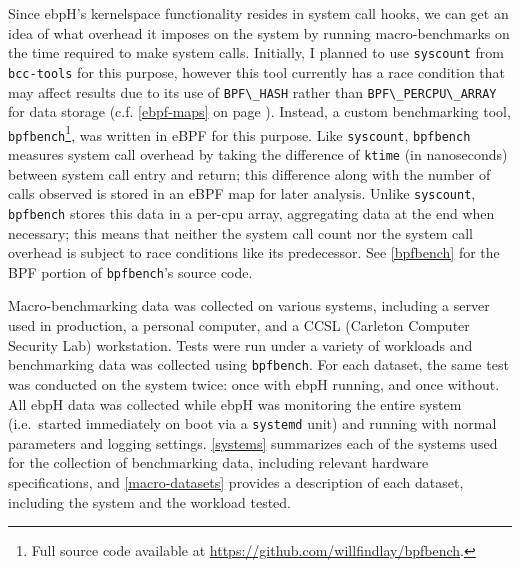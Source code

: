 \documentclass[
  12pt]{findlay}
\newcommand{\passthrough}[1]{#1}
\begin{document}
Since ebpH's kernelspace functionality resides in system call hooks, we
can get an idea of what overhead it imposes on the system by running
macro-benchmarks on the time required to make system calls. Initially, I
planned to use \passthrough{\lstinline!syscount!} \autocite{syscount}
from \passthrough{\lstinline!bcc-tools!} for this purpose, however this
tool currently has a race condition that may affect results due to its
use of \passthrough{\lstinline!BPF\_HASH!} rather than
\passthrough{\lstinline!BPF\_PERCPU\_ARRAY!} for data storage (c.f.
\autoref{ebpf-maps} on page \pageref{ebpf-maps}). Instead, a custom
benchmarking tool,
\passthrough{\lstinline!bpfbench!}\footnote{Full source code available at
\url{https://github.com/willfindlay/bpfbench}.}, was written in eBPF for
this purpose. Like \texttt{syscount}, \passthrough{\lstinline!bpfbench!}
measures system call overhead by taking the difference of
\passthrough{\lstinline!ktime!} (in nanoseconds) between system call
entry and return; this difference along with the number of calls
observed is stored in an eBPF map for later analysis. Unlike
\passthrough{\lstinline!syscount!}, \passthrough{\lstinline!bpfbench!}
stores this data in a per-cpu array, aggregating data at the end when
necessary; this means that neither the system call count nor the system
call overhead is subject to race conditions like its predecessor. See
\autoref{bpfbench} for the BPF portion of
\passthrough{\lstinline!bpfbench!}'s source code.

Macro-benchmarking data was collected on various systems, including a
server used in production, a personal computer, and a CCSL (Carleton
Computer Security Lab) workstation. Tests were run under a variety of
workloads and benchmarking data was collected using
\passthrough{\lstinline!bpfbench!}. For each dataset, the same test was
conducted on the system twice: once with ebpH running, and once without.
All ebpH data was collected while ebpH was monitoring the entire system
(i.e.~started immediately on boot via a
\passthrough{\lstinline!systemd!} unit) and running with normal
parameters and logging settings. \autoref{systems} summarizes each of
the systems used for the collection of benchmarking data, including
relevant hardware specifications, and \autoref{macro-datasets} provides
a description of each dataset, including the system and the workload
tested.
\end{document}
